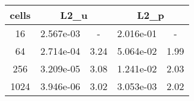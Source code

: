 \documentclass[10pt]{report}
\begin{document}
\begin{table}[H]
\begin{center}
\begin{tabular}{|c|c|c|c|c|} \hline
cells & 
\multicolumn{2}{|c|}{L2_u} & 
\multicolumn{2}{|c|}{L2_p}\\ \hline
16 & 2.567e-03 & - & 2.016e-01 & -\\ \hline
64 & 2.714e-04 & 3.24 & 5.064e-02 & 1.99\\ \hline
256 & 3.209e-05 & 3.08 & 1.241e-02 & 2.03\\ \hline
1024 & 3.946e-06 & 3.02 & 3.053e-03 & 2.02\\ \hline
\end{tabular}
\end{center}
\end{table}
\end{document}
